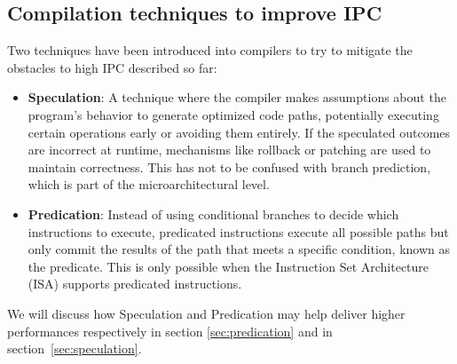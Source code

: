 \subsection{Compilation techniques to improve IPC}
Two techniques have been introduced into compilers to try to mitigate the obstacles to high IPC described so far:

\begin{itemize}
    \item \textbf{Speculation}: A technique where the compiler makes assumptions about the program’s behavior to generate optimized code paths, potentially executing certain operations early or avoiding them entirely. If the speculated outcomes are incorrect at runtime, mechanisms like rollback or patching are used to maintain correctness. This has not to be confused with branch prediction, which is part of the microarchitectural level.
    \item \textbf{Predication}: Instead of using conditional branches to decide which instructions to execute, predicated instructions execute all possible paths but only commit the results of the path that meets a specific condition, known as the predicate. This is only possible when the Instruction Set Architecture (ISA) supports predicated instructions.
\end{itemize} 

We will discuss how Speculation and Predication may help deliver higher performances respectively in section \ref{sec:predication} and in section~\ref{sec:speculation}.

\newpage
